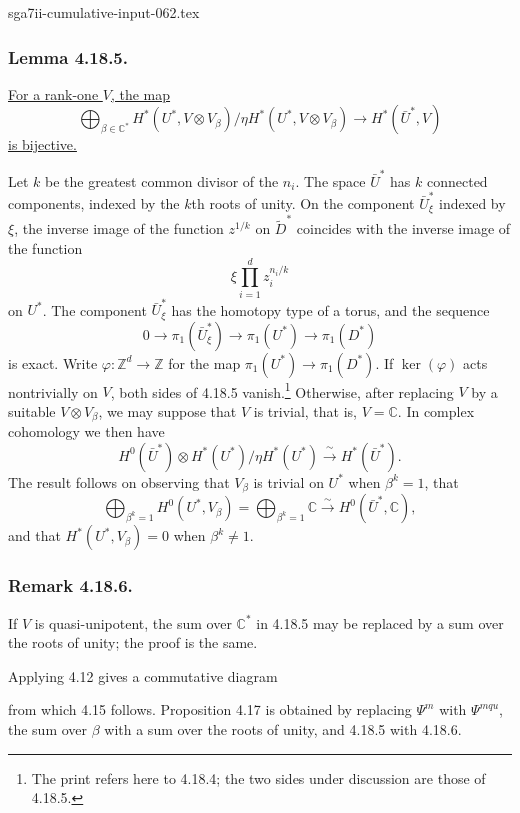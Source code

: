 \begin{filecontents*}{sga7ii-cumulative-input-062.tex}
\subsubsection*{Lemma 4.18.5.}
\underline{For a rank-one $V$, the map}
\[
\bigoplus_{\beta\in\mathbb C^*}
H^*(U^*,V\otimes V_\beta)/
 \eta H^*(U^*,V\otimes V_\beta)
\longrightarrow H^*(\bar U^*,V)
\]
\underline{is bijective.}

Let $k$ be the greatest common divisor of the $n_i$.  The space
$\bar U^*$ has $k$ connected components, indexed by the $k$th roots
of unity.  On the component $\bar U_\xi^*$ indexed by $\xi$, the
inverse image of the function $z^{1/k}$ on $\widetilde D^*$
coincides with the inverse image of the function
\[
\xi\prod_{i=1}^d z_i^{n_i/k}
\]
on $U^*$.  The component $\bar U_\xi^*$ has the homotopy type of a
torus, and the sequence
\[
0\longrightarrow\pi_1(\bar U_\xi^*)
 \longrightarrow\pi_1(U^*)\longrightarrow\pi_1(D^*)
\]
is exact.  Write $\varphi:\mathbb Z^d\to\mathbb Z$ for the map
$\pi_1(U^*)\to\pi_1(D^*)$.  If $\ker(\varphi)$ acts nontrivially on
$V$, both sides of 4.18.5 vanish.\footnote{The print refers here to
4.18.4; the two sides under discussion are those of 4.18.5.}
Otherwise, after replacing $V$ by a suitable $V\otimes V_\beta$, we
may suppose that $V$ is trivial, that is, $V=\mathbb C$.  In complex
cohomology we then have
\[
H^0(\bar U^*)\otimes
 H^*(U^*)/\eta H^*(U^*)
 \xrightarrow{\ \sim\ }H^*(\bar U^*).
\]
The result follows on observing that $V_\beta$ is trivial on $U^*$
when $\beta^k=1$, that
\[
\bigoplus_{\beta^k=1}H^0(U^*,V_\beta)
=\bigoplus_{\beta^k=1}\mathbb C
 \xrightarrow{\ \sim\ }H^0(\bar U^*,\mathbb C),
\]
and that $H^*(U^*,V_\beta)=0$ when $\beta^k\ne1$.

\subsubsection*{Remark 4.18.6.}
If $V$ is quasi-unipotent, the sum over $\mathbb C^*$ in 4.18.5 may
be replaced by a sum over the roots of unity; the proof is the same.

Applying 4.12 gives a commutative diagram
\begin{center}
\end{center}
from which 4.15 follows.  Proposition 4.17 is obtained by replacing
$\Psi^m$ with $\Psi^{mqu}$, the sum over $\beta$ with a sum over the
roots of unity, and 4.18.5 with 4.18.6.
\end{filecontents*}

